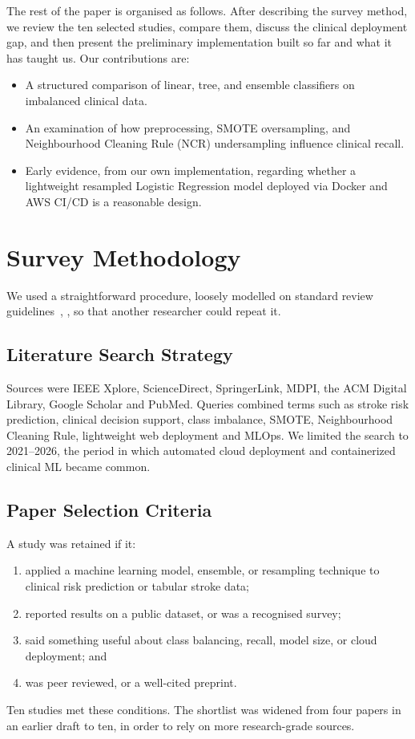 \documentclass[10pt,journal,compsoc]{IEEEtran}
\begin{document}
The rest of the paper is organised as follows. After describing the survey method, we review the ten selected studies, compare them, discuss the clinical deployment gap, and then present the preliminary implementation built so far and what it has taught us. Our contributions are:
\begin{itemize}
    \item A structured comparison of linear, tree, and ensemble classifiers on imbalanced clinical data.
    \item An examination of how preprocessing, SMOTE oversampling, and Neighbourhood Cleaning Rule (NCR) undersampling influence clinical recall.
    \item Early evidence, from our own implementation, regarding whether a lightweight resampled Logistic Regression model deployed via Docker and AWS CI/CD is a reasonable design.
\end{itemize}

\section{Survey Methodology}
We used a straightforward procedure, loosely modelled on standard review guidelines~\cite{kitchenham2007}, \cite{okoli2015}, so that another researcher could repeat it.

\subsection{Literature Search Strategy}
Sources were IEEE Xplore, ScienceDirect, SpringerLink, MDPI, the ACM Digital Library, Google Scholar and PubMed. Queries combined terms such as stroke risk prediction, clinical decision support, class imbalance, SMOTE, Neighbourhood Cleaning Rule, lightweight web deployment and MLOps. We limited the search to 2021--2026, the period in which automated cloud deployment and containerized clinical ML became common.

\subsection{Paper Selection Criteria}
A study was retained if it:
\begin{enumerate}
    \item applied a machine learning model, ensemble, or resampling technique to clinical risk prediction or tabular stroke data;
    \item reported results on a public dataset, or was a recognised survey;
    \item said something useful about class balancing, recall, model size, or cloud deployment; and
    \item was peer reviewed, or a well-cited preprint.
\end{enumerate}
Ten studies met these conditions. The shortlist was widened from four papers in an earlier draft to ten, in order to rely on more research-grade sources.
\end{document}
